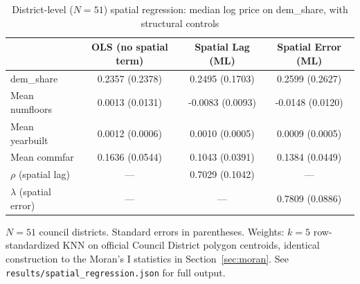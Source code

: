 \begin{table}[htbp]
\centering
\caption{District-level ($N=51$) spatial regression: median log price on dem\_share, with structural controls}
\label{tab:spatial}
\begin{tabular}{lccc}
\toprule
 & OLS (no spatial term) & Spatial Lag (ML) & Spatial Error (ML) \\
\midrule
dem\_share & 0.2357 (0.2378) & 0.2495 (0.1703) & 0.2599 (0.2627) \\
Mean numfloors & 0.0013 (0.0131) & -0.0083 (0.0093) & -0.0148 (0.0120) \\
Mean yearbuilt & 0.0012 (0.0006) & 0.0010 (0.0005) & 0.0009 (0.0005) \\
Mean commfar & 0.1636 (0.0544) & 0.1043 (0.0391) & 0.1384 (0.0449) \\
\midrule
$\rho$ (spatial lag) & --- & 0.7029 (0.1042) & --- \\
$\lambda$ (spatial error) & --- & --- & 0.7809 (0.0886) \\
\bottomrule
\end{tabular}
\vspace{2pt}
\begin{minipage}{0.95\textwidth}
\footnotesize $N=51$ council districts. Standard errors in parentheses. Weights: $k=5$ row-standardized KNN on official Council District polygon centroids, identical construction to the Moran's I statistics in Section~\ref{sec:moran}. See \texttt{results/spatial\_regression.json} for full output.
\end{minipage}
\end{table}